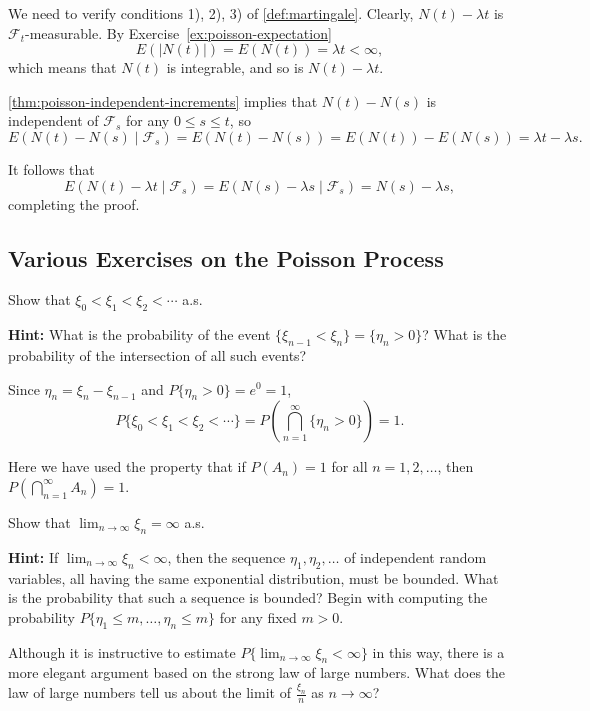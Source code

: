 \begin{Solution}
We need to verify conditions 1), 2), 3) of \cref{def:martingale}. Clearly, $N(t) - \lambda t$ is $\mathcal{F}_t$-measurable. By Exercise~\ref{ex:poisson-expectation}
\[
E(|N(t)|) = E(N(t)) = \lambda t < \infty,
\]
which means that $N(t)$ is integrable, and so is $N(t) - \lambda t$.

\cref{thm:poisson-independent-increments} implies that $N(t) - N(s)$ is independent of $\mathcal{F}_s$ for any $0 \leq s \leq t$, so
\[
E(N(t) - N(s) \mid \mathcal{F}_s) = E(N(t) - N(s)) = E(N(t)) - E(N(s)) = \lambda t - \lambda s.
\]

It follows that
\[
E(N(t) - \lambda t \mid \mathcal{F}_s) = E(N(s) - \lambda s \mid \mathcal{F}_s) = N(s) - \lambda s,
\]
completing the proof.
\end{Solution}

\subsection{Various Exercises on the Poisson Process}
\label{sec:poisson-exercises}

\begin{Exercise}
\label{ex:jump-times-increasing}
Show that $\xi_0 < \xi_1 < \xi_2 < \cdots$ a.s.

\noindent\textbf{Hint:} What is the probability of the event $\{\xi_{n-1} < \xi_n\} = \{\eta_n > 0\}$? What is the probability of the intersection of all such events?
\end{Exercise}

\begin{Solution}
Since $\eta_n = \xi_n - \xi_{n-1}$ and $P\{\eta_n > 0\} = e^0 = 1$,
\[
P\{\xi_0 < \xi_1 < \xi_2 < \cdots\} = P\left(\bigcap_{n=1}^{\infty} \{\eta_n > 0\}\right) = 1.
\]

Here we have used the property that if $P(A_n) = 1$ for all $n = 1, 2, \ldots$, then $P\left(\bigcap_{n=1}^{\infty} A_n\right) = 1$.
\end{Solution}

\begin{Exercise}
\label{ex:jump-times-converge-infinity}
Show that $\lim_{n \to \infty} \xi_n = \infty$ a.s.

\noindent\textbf{Hint:} If $\lim_{n \to \infty} \xi_n < \infty$, then the sequence $\eta_1, \eta_2, \ldots$ of independent random variables, all having the same exponential distribution, must be bounded. What is the probability that such a sequence is bounded? Begin with computing the probability $P\{\eta_1 \leq m, \ldots, \eta_n \leq m\}$ for any fixed $m > 0$.

Although it is instructive to estimate $P\{\lim_{n \to \infty} \xi_n < \infty\}$ in this way, there is a more elegant argument based on the strong law of large numbers. What does the law of large numbers tell us about the limit of $\frac{\xi_n}{n}$ as $n \to \infty$?
\end{Exercise}

